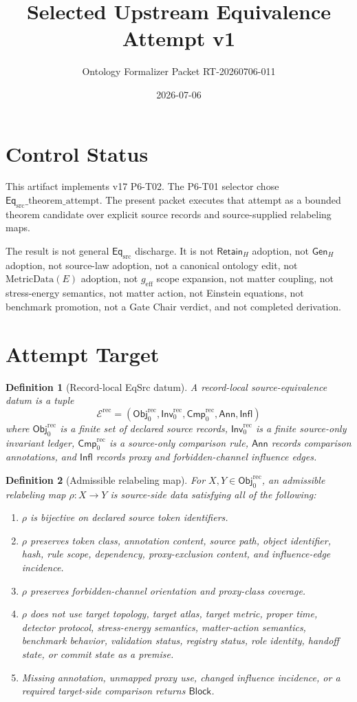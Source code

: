 \documentclass[11pt]{article}
\title{Selected Upstream Equivalence Attempt v1}
\author{Ontology Formalizer Packet RT-20260706-011}
\date{2026-07-06}
\newcommand{\EqSrc}{\mathsf{Eq}_{\mathrm{src}}}
\newcommand{\Obj}{\mathsf{Obj}_{0}^{\mathrm{rec}}}
\newcommand{\Inv}{\mathsf{Inv}_{0}^{\mathrm{rec}}}
\newcommand{\Cmp}{\mathsf{Cmp}_{0}^{\mathrm{rec}}}
\newcommand{\Ann}{\mathsf{Ann}}
\newcommand{\Infl}{\mathsf{Infl}}
\newcommand{\Block}{\mathsf{Block}}
\newcommand{\RetainH}{\mathsf{Retain}_{H}}
\newcommand{\GenH}{\mathsf{Gen}_{H}}
\newcommand{\MetricData}{\mathrm{MetricData}(E)}
\newcommand{\geff}{g_{\mathrm{eff}}}
\newtheorem{definition}{Definition}
\begin{document}
\maketitle

\section{Control Status}

This artifact implements v17 P6-T02. The P6-T01 selector chose
\(\EqSrc\_\mathrm{theorem\_attempt}\). The present packet executes that
attempt as a bounded theorem candidate over explicit source records and
source-supplied relabeling maps.

The result is not general \(\EqSrc\) discharge. It is not \(\RetainH\)
adoption, not \(\GenH\) adoption, not source-law adoption, not a canonical
ontology edit, not \(\MetricData\) adoption, not \(\geff\) scope expansion,
not matter coupling, not stress-energy semantics, not matter action, not
Einstein equations, not benchmark promotion, not a Gate Chair verdict, and
not completed derivation.

\section{Attempt Target}

\begin{definition}[Record-local EqSrc datum]
A record-local source-equivalence datum is a tuple
\[
  \mathcal E^{\mathrm{rec}}=(\Obj,\Inv,\Cmp,\Ann,\Infl)
\]
where \(\Obj\) is a finite set of declared source records, \(\Inv\) is a
finite source-only invariant ledger, \(\Cmp\) is a source-only comparison
rule, \(\Ann\) records comparison annotations, and \(\Infl\) records proxy
and forbidden-channel influence edges.
\end{definition}

\begin{definition}[Admissible relabeling map]
For \(X,Y\in\Obj\), an admissible relabeling map
\(\rho:X\to Y\) is source-side data satisfying all of the following:
\begin{enumerate}[leftmargin=*]
  \item \(\rho\) is bijective on declared source token identifiers.
  \item \(\rho\) preserves token class, annotation content, source path,
  object identifier, hash, rule scope, dependency, proxy-exclusion content,
  and influence-edge incidence.
  \item \(\rho\) preserves forbidden-channel orientation and proxy-class
  coverage.
  \item \(\rho\) does not use target topology, target atlas, target metric,
  proper time, detector protocol, stress-energy semantics, matter-action
  semantics, benchmark behavior, validation status, registry status, role
  identity, handoff state, or commit state as a premise.
  \item Missing annotation, unmapped proxy use, changed influence incidence,
  or a required target-side comparison returns \(\Block\).
\end{enumerate}
\end{definition}
\end{document}
